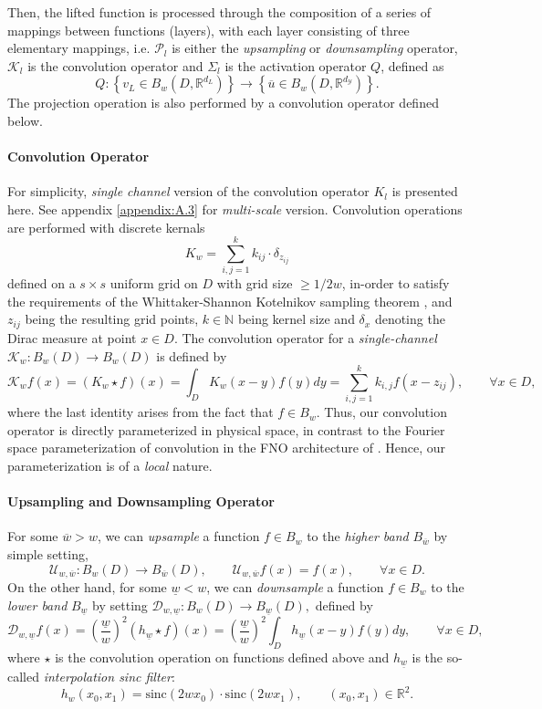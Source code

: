 \documentclass[reqno,10pt]{amsart}
\theoremstyle{plain}
\newcommand{\sinc}{\text{sinc}}
\theoremstyle{definition}
\newcommand{\bb}[1]{\mathbb{#1}}
\newcommand{\cal}[1]{\mathcal{#1}}
\begin{document}
    \noindent Then, the lifted function is processed through the composition of a series of mappings between functions (layers), with each layer consisting of three elementary mappings, i.e. $\cal P_l$ is either the {\it upsampling} or {\it downsampling} operator, $\cal K_l$ is the convolution operator and $\Sigma_l$ is the activation operator $Q$, defined as 
    $$ Q : \left\{v_L \in B_w(D,\bb R^{d_L}) \right\} \to \left\{\overline{u} \in B_w(D,\bb R^{d_{\cal Y}}) \right\}.$$
    The projection operation is also performed by a convolution operator defined below.

    \paragraph{\bf Convolution Operator} For simplicity, {\it single channel} version of the convolution operator $K_l$ is presented here. See appendix \ref{appendix:A.3} for {\it multi-scale} version. Convolution operations are performed with discrete kernals
    $$ K_w = \sum_{i,j=1}^{k} k_{ij} \cdot \delta_{z_{ij}}$$
    defined on a $s \times s$ uniform grid on $D$ with grid size $\geq 1/2w$, in-order to satisfy the requirements of the Whittaker-Shannon Kotelnikov sampling theorem \cite{MU2000}, and $z_{ij}$ being the resulting grid points, $k \in\bb N$ being kernel size and $\delta_x$ denoting the Dirac measure at point $x\in D$. The convolution operator for a {\it single-channel} $\cal K_w : B_w(D) \to B_w(D)$ is defined by 
    $$ \cal K_wf(x) = (K_w \star f)(x) = \int_D K_w(x-y)f(y) dy = \sum_{i,j=1}^{k} k_{i,j} f(x-z_{ij}), \qquad \forall x\in D,$$
    where the last identity arises from the fact that $f \in B_w$. Thus, our convolution operator is directly parameterized in physical space, in contrast to the Fourier space parameterization of convolution in the FNO architecture of \cite{ZL2021}. Hence, our parameterization is of a {\it local} nature.

    \paragraph{\bf Upsampling and Downsampling Operator} For some $\overline{w} > w$, we can {\it upsample} a function $f \in B_w$ to the {\it higher band} $B_{\overline{w}}$ by simple setting,
    $$ \cal U_{w,\overline{w}}: B_w(D) \to B_{\overline{w}}(D), \qquad \cal U_{w,\overline{w}} f(x) = f(x), \qquad \forall x\in D.$$
    On the other hand, for some $\underline{w} < w$, we can {\it downsample} a function $ f\in B_w$ to the {\it lower band} $B_{\underline{w}}$ by setting $\cal D_{w,\underline{w}} : B_w(D) \to B_{\underline{w}}(D),$ defined by 
    $$\cal D_{w,\underline{w}}f(x) = \left(\frac{\underline{w}}{w}\right)^2 (h_{\underline{w}} \star f)(x) = \left(\frac{\underline{w}}{w}\right)^2 \int_D h_{\underline{w}}(x-y) f(y) dy, \qquad \forall x\in D,$$
    where $\star$ is the convolution operation on functions defined above and $h_{\underline{w}}$ is the so-called {\it interpolation sinc filter}:
    \begin{equation}\label{eq2.5}
        h_w(x_0,x_1) = \sinc(2wx_0) \cdot \sinc(2wx_1), \qquad (x_0,x_1) \in \bb R^2.
    \end{equation}
\end{document}
